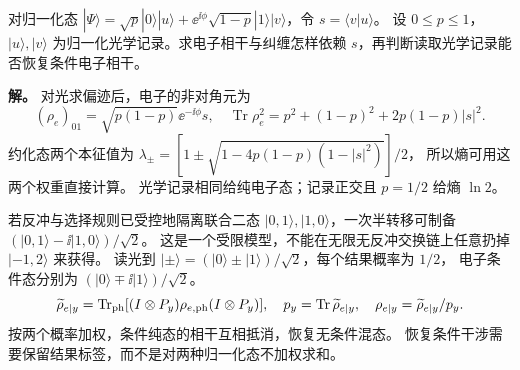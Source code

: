 \begin{exbox}
对归一化态 $|\Psi\rangle=\sqrt p|0\rangle|u\rangle
+\ee^{\ii\phi}\sqrt{1-p}|1\rangle|v\rangle$，令 $s=\langle v|u\rangle$。
设 $0\le p\le1$，$|u\rangle,|v\rangle$ 为归一化光学记录。求电子相干与纠缠怎样依赖 $s$，再判断读取光学记录能否恢复条件电子相干。

\textbf{解。} 对光求偏迹后，电子的非对角元为
\begin{equation}
(\rho_e)_{01}=\sqrt{p(1-p)}\ee^{-\ii\phi}s,
\quad\operatorname{Tr}\rho_e^2=p^2+(1-p)^2+2p(1-p)|s|^2.
\label{eq:feqo-which-path-overlap}
\end{equation}
约化态两个本征值为
$\lambda_\pm=[1\pm\sqrt{1-4p(1-p)(1-|s|^2)}]/2$，
所以熵可用这两个权重直接计算。
光学记录相同给纯电子态；记录正交且 $p=1/2$ 给熵 $\ln2$。

若反冲与选择规则已受控地隔离联合二态
$|0,1\rangle,|1,0\rangle$，一次半转移可制备
$(|0,1\rangle-\ii|1,0\rangle)/\sqrt2$。
这是一个受限模型，不能在无限无反冲交换链上任意扔掉 $|-1,2\rangle$ 来获得。
读光到 $|\pm\rangle=(|0\rangle\pm|1\rangle)/\sqrt2$，每个结果概率为 $1/2$，
电子条件态分别为 $(|0\rangle\mp\ii|1\rangle)/\sqrt2$。
\begin{equation}
\widetilde\rho_{e|y}=\operatorname{Tr}_{\rm ph}
[(I\otimes P_y)\rho_{e,\rm ph}(I\otimes P_y)],
\quad p_y=\operatorname{Tr}\widetilde\rho_{e|y},
\quad\rho_{e|y}=\widetilde\rho_{e|y}/p_y.
\label{eq:feqo-conditional-electron-state}
\end{equation}
按两个概率加权，条件纯态的相干互相抵消，恢复无条件混态。
恢复条件干涉需要保留结果标签，而不是对两种归一化态不加权求和。
\end{exbox}
